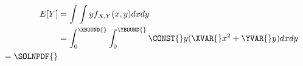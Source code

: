 \begin{equation*}
\begin{split}
E[Y] &= \int \int y f_{X,Y} (x,y) dx dy \\ &= \int_{0}^{\XBOUND{}} \int_{0}^{\YBOUND{}} \CONST{} y (\XVAR{} x^2 +\YVAR{} y) dx dy \\
=\SOLNPDF{}
\end{split}
\end{equation*}